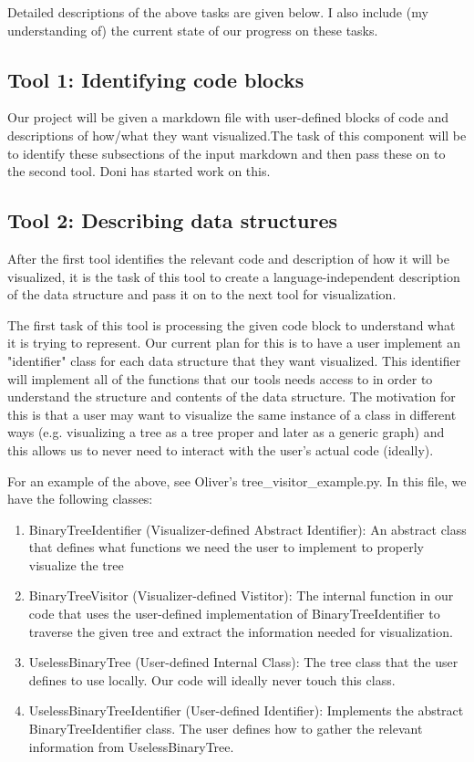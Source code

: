 \documentclass[12pt]{article}
\begin{document}
Detailed descriptions of the above tasks are given below. I also include (my understanding of) the current state of our progress on these tasks. 

\subsection*{Tool 1: Identifying code blocks}

Our project will be given a markdown file with user-defined blocks of code and descriptions of how/what they want visualized.The task of this component will be to identify these subsections of the input markdown and then pass these on to the second tool. Doni has started work on this.

\subsection*{Tool 2: Describing data structures}
After the first tool identifies the relevant code and description of how it will be visualized, it is the task of this tool to create a language-independent description of the data structure and pass it on to the next tool for visualization. 

The first task of this tool is processing the given code block to understand what it is trying to represent. Our current plan for this is to have a user implement an "identifier" class for each data structure that they want visualized. This identifier will implement all of the functions that our tools needs access to in order to understand the structure and contents of the data structure. The motivation for this is that a user may want to visualize the same instance of a class in different ways (e.g. visualizing a tree as a tree proper and later as a generic graph) and this allows us to never need to interact with the user's actual code (ideally). 

For an example of the above, see Oliver's tree\_visitor\_example.py. In this file, we have the following classes:
\begin{enumerate}
\item BinaryTreeIdentifier (Visualizer-defined Abstract Identifier): An abstract class that defines what functions we need the user to implement to properly visualize the tree
\item BinaryTreeVisitor (Visualizer-defined Vistitor): The internal function in our code that uses the user-defined implementation of BinaryTreeIdentifier to traverse the given tree and extract the information needed for visualization.
\item UselessBinaryTree (User-defined Internal Class): The tree class that the user defines to use locally. Our code will ideally never touch this class.
\item UselessBinaryTreeIdentifier (User-defined Identifier): Implements the abstract BinaryTreeIdentifier class. The user defines how to gather the relevant information from UselessBinaryTree.
\end{enumerate}
\end{document}
